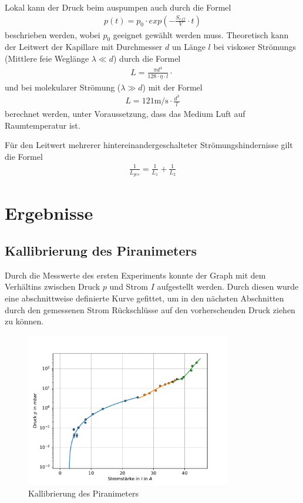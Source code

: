 \documentclass[11pt, a4paper]{article}
\begin{document}
    Lokal kann der Druck beim auspumpen auch durch die Formel
    \begin{align}
        p\left(t\right) = p_0 \cdot exp\left(- \frac{S_{eff}}{V} \cdot t\right)
    \end{align}
    beschrieben werden, wobei $p_0$ geeignet gewählt werden muss.
    Theoretisch kann der Leitwert der Kapillare mit Durchmesser $d$ un Länge $l$ bei viskoser Strömungs (Mittlere feie Weglänge $\lambda \ll d$) durch die Formel
    \begin{align}
        L = \frac{\pi d^4}{128 \cdot \eta \cdot l} \cdot \frac{}{}
    \end{align}
    und bei molekularer Strömung ($\lambda \gg d$) mit der Formel
    \begin{align}
        L = 121 \si{\meter\per\second} \cdot \frac{d^3}{l}
    \end{align}
    berechnet werden, unter Voraussetzung, dass das Medium Luft auf Raumtemperatur ist.

    Für den Leitwert mehrerer hintereinandergeschalteter Strömungshindernisse gilt die Formel
    \begin{align}
        \frac{1}{L_{ges}} = \frac{1}{L_1} + \frac{1}{L_2}
    \end{align}






    \section{Ergebnisse}
    \subsection{Kallibrierung des Piranimeters}
    Durch die Messwerte des ersten Experiments konnte der Graph mit dem Verhältins zwischen Druck $p$ und Strom $I$ aufgestellt werden. Durch diesen wurde eine abschnittweise definierte Kurve gefittet, um in den nächsten Abschnitten durch den gemessenen Strom Rückschlüsse auf den vorherschenden Druck ziehen zu können.
    \begin{figure}[h]
        \centering
        \includegraphics[width=0.8\textwidth]{Kallibrierung.pdf}
        \caption{Kallibrierung des Piranimeters}
        \label{fig:piranim}
    \end{figure}
\end{document}
